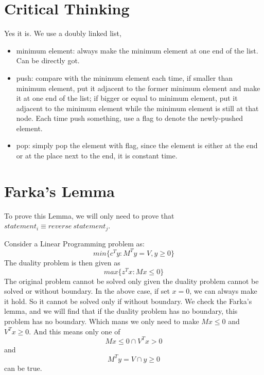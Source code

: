 \documentclass{article}
\begin{document}
\section{Critical Thinking}
Yes it is. We use a doubly linked list, 
\begin{itemize}
\item minimum element: always make the minimum element at one end of the list. Can be directly got.
\item push: compare with the minimum element each time, if smaller than minimum element, put it adjacent to the former minimum element and make it at one end of the list; if bigger or equal to minimum element, put it adjacent to the minimum element while the minimum element is still at that node. Each time push something, use a flag to denote the newly-pushed element. 
\item pop: simply pop the element with flag, since the element is either at the end or at the place next to the end, it is constant time.
\end{itemize}

\section{Farka's Lemma}
To prove this Lemma, we will only need to prove that $statement_i \equiv reverse \ statement_j$.

Consider a Linear Programming problem as: 
\[
	min\{c^T y: M^T y= V, y\geq 0\}
\]
The duality problem is then given as 
\[
	max\{z^T x: Mx\leq 0\}
\]
The original problem cannot be solved only given the duality problem cannot be solved or without boundary. In the above case, if set $x=0$, we can always make it hold. So it cannot be solved only if without boundary. We check the Farka's lemma, and we will find that if the duality problem has no boundary, this problem has no boundary. Which mans we only need to make $Mx\leq 0$ and $V^T x \geq 0$. And this means only one of 
\[
	Mx\leq 0 \cap V^T x> 0 
\] 
and 
\[
	 M^T y = V \cap y \geq 0
\]
can be true.
\end{document}
